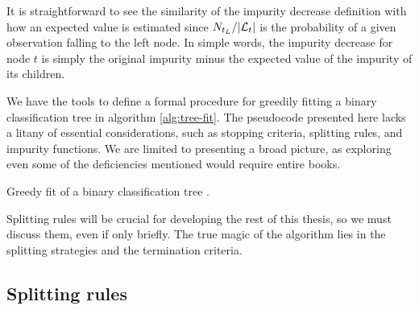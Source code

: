 It is straightforward to see the similarity of the impurity decrease definition
with how an expected value is estimated since $N_{t_L} / |\mathcal{L}_t|$ is the
probability of a given observation falling to the left node. In simple words,
the impurity decrease for node $t$ is simply the original impurity minus the
expected value of the impurity of its children.

We have the tools to define a formal procedure for greedily fitting a binary
classification tree in algorithm \ref{alg:tree-fit}. The pseudocode presented
here lacks a litany of essential considerations, such as stopping criteria,
splitting rules, and impurity functions. We are limited to presenting a broad
picture, as exploring even some of the deficiencies mentioned would require
entire books.

\begin{algorithm}
    \caption[Greedy tree fitting algorithm]{Greedy fit of a binary
        classification tree \cite[Ch.~3.3]{louppe2014}.}
    \label{alg:tree-fit}
\end{algorithm}

Splitting rules will be crucial for developing the rest of this thesis, so we
must discuss them, even if only briefly. The true magic of the algorithm lies in
the splitting strategies and the termination criteria.

\subsection{Splitting rules}

